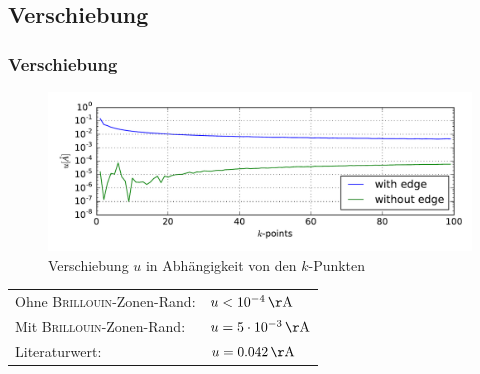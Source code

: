 
\subsection{Verschiebung}
\begin{frame}
\frametitle{Verschiebung}
\begin{figure}
	\centering
	\includegraphics[width = \textwidth]{Images/polyacetylene/convergence/polyacetylene_displacement}
	\caption{Verschiebung $u$ in Abhängigkeit von den $k$-Punkten}
	\label{image_k_point_sampling_assymetry}
\end{figure}
\centering
\begin{tabular}{ll}
Ohne \textsc{Brillouin}-Zonen-Rand:& $u < \unit[10^{-4}]{\AA}$\\
Mit \textsc{Brillouin}-Zonen-Rand:&$u = \unit[5\cdot10^{-3}]{\AA}$\\
Literaturwert:& $u = \unit[0.042]{\AA}$
\end{tabular}
\end{frame}

